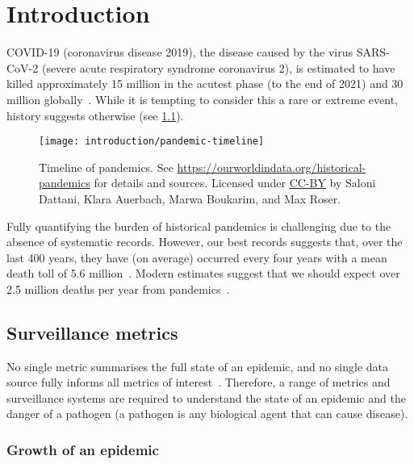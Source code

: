 \documentclass[thesis.tex]{subfiles}
\begin{document}
\chapter{Introduction} \label{intro}

COVID-19 (coronavirus disease 2019), the disease caused by the virus SARS-CoV-2 (severe acute respiratory syndrome coronavirus 2), is estimated to have killed approximately 15 million in the acutest phase (to the end of 2021) and 30 million globally~\autocite{whoCOVIDExcess,economistCOVIDExcess}.
While it is tempting to consider this a rare or extreme event, history suggests otherwise (see \cref{intro:fig:pandemic-timeline}).
\begin{figure}
    \texttt{[image: introduction/pandemic-timeline]}
    \caption[Timeline of pandemics.]{%
        Timeline of pandemics.
        See \url{https://ourworldindata.org/historical-pandemics} for details and sources.
        Licensed under \href{https://creativecommons.org/licenses/by/4.0/}{CC-BY} by Saloni Dattani, Klara Auerbach, Marwa Boukarim, and Max Roser.
    }
    \label{intro:fig:pandemic-timeline}
\end{figure}

Fully quantifying the burden of historical pandemics is challenging due to the absence of systematic records.
However, our best records suggests that, over the last 400 years, they have (on average) occurred every four years with a mean death toll of 5.6 million~\autocite{maraniNovelEpidemics}.
Modern estimates suggest that we should expect over 2.5 million deaths per year from pandemics~\autocite{madhavPandemicMortality}.


\section{Surveillance metrics}

No single metric summarises the full state of an epidemic, and no single data source fully informs all metrics of interest~\autocite{royalSocietyRnumber,pellisEstimation,paragGrowthRates}.
Therefore, a range of metrics and surveillance systems are required to understand the state of an epidemic and the danger of a pathogen (a pathogen is any biological agent that can cause disease).

\subsection{Growth of an epidemic}
\end{document}
